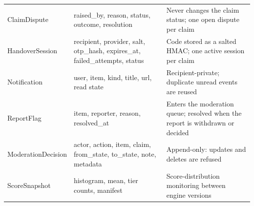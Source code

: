 \documentclass[12pt,a4paper,oneside]{report}
\begin{document}
\begin{table}[H]
\begin{tabularx}{\textwidth}{P{28mm}P{50mm}X}
ClaimDispute & raised\_by, reason, status, outcome, resolution & Never changes the claim status; one open dispute per claim\\
HandoverSession & recipient, provider, salt, otp\_hash, expires\_at, failed\_attempts, status & Code stored as a salted HMAC; one active session per claim\\
Notification & user, item, kind, title, url, read state & Recipient-private; duplicate unread events are reused\\
ReportFlag & item, reporter, reason, resolved\_at & Enters the moderation queue; resolved when the report is withdrawn or decided\\
ModerationDecision & actor, action, item, claim, from\_state, to\_state, note, metadata & Append-only: updates and deletes are refused\\
ScoreSnapshot & histogram, mean, tier counts, manifest & Score-distribution monitoring between engine versions\\
\bottomrule
\end{tabularx}
\end{table}
\end{document}
